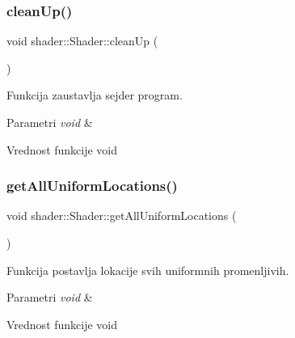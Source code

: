 \subsubsection{\texorpdfstring{clean\+Up()}{cleanUp()}}
{\footnotesize\ttfamily void shader\+::\+Shader\+::clean\+Up (\begin{DoxyParamCaption}\item[{void}]{ }\end{DoxyParamCaption})}



Funkcija zaustavlja sejder program. 


\begin{DoxyParams}{Parametri}
{\em void} & \\
\hline
\end{DoxyParams}
\begin{DoxyReturn}{Vrednost funkcije}
void 
\end{DoxyReturn}
\mbox{\label{classshader_1_1Shader_a31d479c8502f9172c8b9393be362f391}} 
\subsubsection{\texorpdfstring{get\+All\+Uniform\+Locations()}{getAllUniformLocations()}}
{\footnotesize\ttfamily void shader\+::\+Shader\+::get\+All\+Uniform\+Locations (\begin{DoxyParamCaption}\item[{void}]{ }\end{DoxyParamCaption})}



Funkcija postavlja lokacije svih uniformnih promenljivih. 


\begin{DoxyParams}{Parametri}
{\em void} & \\
\hline
\end{DoxyParams}
\begin{DoxyReturn}{Vrednost funkcije}
void 
\end{DoxyReturn}
\mbox{\label{classshader_1_1Shader_a91ddc84588431a520654096a74ca3671}} 
